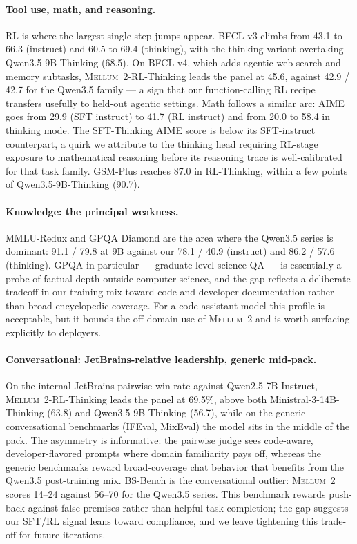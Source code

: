 \documentclass[11pt,a4paper]{article}
\newcommand{\modelname}{\textsc{Mellum~2}\xspace}
\begin{document}
\paragraph{Tool use, math, and reasoning.}
RL is where the largest single-step jumps appear. BFCL v3 climbs from
43.1 to 66.3 (instruct) and 60.5 to 69.4 (thinking), with the thinking
variant overtaking Qwen3.5-9B-Thinking (68.5). On BFCL v4, which adds
agentic web-search and memory subtasks, \modelname-RL-Thinking leads
the panel at 45.6, against 42.9 / 42.7 for the Qwen3.5 family --- a
sign that our function-calling RL recipe transfers usefully to
held-out agentic settings. Math follows a similar arc: AIME goes from
29.9 (SFT instruct) to 41.7 (RL instruct) and from 20.0 to 58.4 in
thinking mode. The SFT-Thinking AIME score is below its SFT-instruct
counterpart, a quirk we attribute to the thinking head requiring
RL-stage exposure to mathematical reasoning before its reasoning
trace is well-calibrated for that task family. GSM-Plus reaches 87.0
in RL-Thinking, within a few points of Qwen3.5-9B-Thinking (90.7).

\paragraph{Knowledge: the principal weakness.}
MMLU-Redux and GPQA Diamond are the area where the Qwen3.5 series is
dominant: 91.1 / 79.8 at 9B against our 78.1 / 40.9 (instruct) and
86.2 / 57.6 (thinking). GPQA in particular --- graduate-level science
QA --- is essentially a probe of factual depth outside computer
science, and the gap reflects a deliberate tradeoff in our training
mix toward code and developer documentation rather than broad
encyclopedic coverage. For a code-assistant model this profile is
acceptable, but it bounds the off-domain use of \modelname and is
worth surfacing explicitly to deployers.

\paragraph{Conversational: JetBrains-relative leadership, generic mid-pack.}
On the internal JetBrains pairwise win-rate against
Qwen2.5-7B-Instruct, \modelname-RL-Thinking leads the panel at 69.5\%,
above both Ministral-3-14B-Thinking (63.8) and Qwen3.5-9B-Thinking
(56.7), while on the generic conversational benchmarks (IFEval,
MixEval) the model sits in the middle of the pack. The asymmetry is
informative: the pairwise judge sees code-aware, developer-flavored
prompts where domain familiarity pays off, whereas the generic
benchmarks reward broad-coverage chat behavior that benefits from the
Qwen3.5 post-training mix. BS-Bench is the conversational outlier:
\modelname scores 14--24 against 56--70 for the Qwen3.5 series. This
benchmark rewards push-back against false premises rather than helpful
task completion; the gap suggests our SFT/RL signal leans toward
compliance, and we leave tightening this trade-off for future
iterations.
\end{document}
